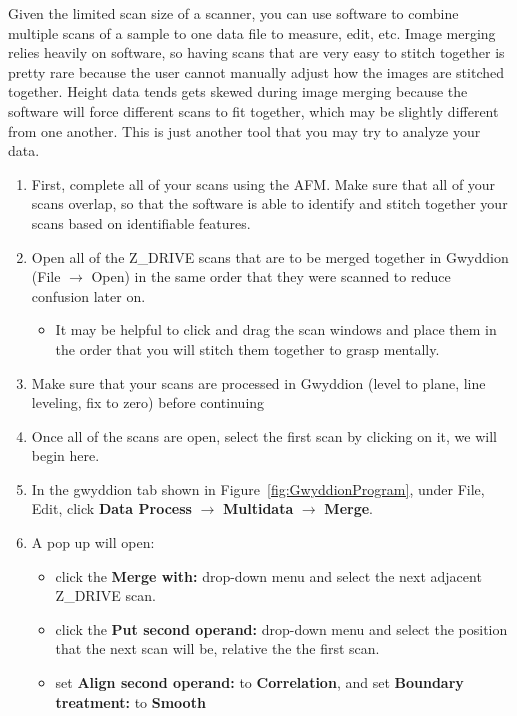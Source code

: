 \documentclass{../lab}
\begin{document}
Given the limited scan size of a scanner, you can use software to combine multiple scans of a sample to one data file to measure, edit, etc.  Image merging relies heavily on software, so having scans that are very easy to stitch together is pretty rare because the user cannot manually adjust how the images are stitched together.  Height data tends gets skewed during image merging because the software will force different scans to fit together, which may be slightly different from one another.  This is just another tool that you may try to analyze your data.
\begin{enumerate}
    \item First, complete all of your scans using the AFM.  Make sure that all of your scans overlap, so that the software is able to identify and stitch together your scans based on identifiable features.
    
    \item Open all of the Z\_DRIVE scans that are to be merged together in Gwyddion (File $\rightarrow$ Open) in the same order that they were scanned to reduce confusion later on.
    \begin{itemize}
        \item It may be helpful to click and drag the scan windows and place them in the order that you will stitch them together to grasp mentally.
    \end{itemize}
    
    \item Make sure that your scans are processed in Gwyddion (level to plane, line leveling, fix to zero) before continuing
    
    \item Once all of the scans are open, select the first scan by clicking on it, we will begin here.
    
    \item In the gwyddion tab shown in Figure~\ref{fig:GwyddionProgram}, under File, Edit, click \textbf{Data Process} $\rightarrow$ \textbf{Multidata }$\rightarrow$ \textbf{Merge}.
    
    \item A pop up will open:
    \begin{itemize}
        \item click the \textbf{Merge with:} drop-down menu and select the next adjacent Z\_DRIVE scan.
        \item click the \textbf{Put second operand:} drop-down menu and select the position that the next scan will be, relative the the first scan.
        \item set \textbf{Align second operand:} to \textbf{Correlation}, and set \textbf{Boundary treatment:} to \textbf{Smooth}
    \end{itemize}
    

\end{enumerate}
\end{document}
